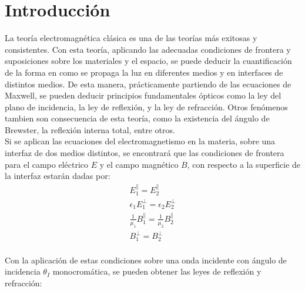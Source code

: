 \documentclass[%
 reprint,
 amsmath,amssymb,
 aps,
]{revtex4-1}
\begin{document}
\maketitle


\section{\label{sec:level1}Introducci\'on}

La teoría electromagnética clásica es una de las teorías más exitosas y consistentes. Con esta teoría, aplicando las adecuadas condiciones de frontera y suposiciones sobre los materiales y el espacio, se puede deducir la cuantificación de la forma en como se propaga la luz en diferentes medios y en interfaces de distintos medios. De esta manera, prácticamente partiendo de las ecuaciones de Maxwell, se pueden deducir principios fundamentales ópticos como la ley del plano de incidencia, la ley de reflexión, y la ley de refracción. Otros fenómenos tambien son consecuencia de esta teoría, como la existencia del ángulo de Brewster, la reflexión interna total, entre otros.\\

Si se aplican las ecuaciones del electromagnetismo en la materia, sobre una interfaz de dos medios distintos, se encontrará que las condiciones de frontera para el campo eléctrico $E$ y el campo magnético $B$, con respecto a la superficie de la interfaz estarán dadas por: \cite{Griffiths}\\

\begin{align*}
E_1^{\parallel} = E_2^{\parallel}\\
\epsilon_1E_1^{\perp} = \epsilon_2E_2^{\perp}\\
\frac{1}{\mu_1}B_1^{\parallel} = \frac{1}{\mu_2}B_2^{\parallel}\\
B_1^{\perp} = B_2^{\perp}\\
\end{align*}

Con la aplicación de estas condiciones sobre una onda incidente con ángulo de incidencia $\theta_I$ monocromática, se pueden obtener las leyes de reflexión y refracción:\cite{Griffiths}\\
\end{document}
